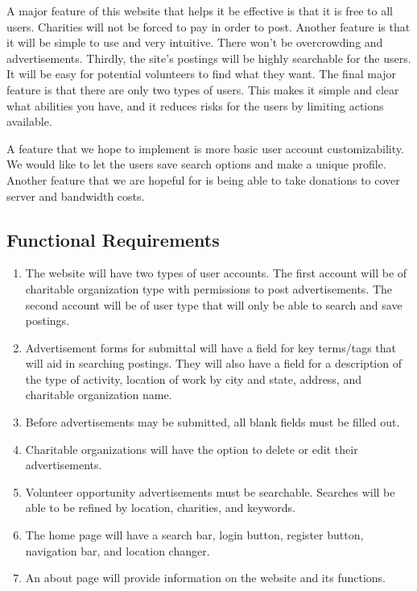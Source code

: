 \documentclass[12pt]{article}
\begin{document}
A major feature of this website that helps it be effective is that it is free to all
users. Charities will not be forced to pay in order to post. Another feature is that it
will be simple to use and very intuitive. There won't be overcrowding and advertisements.
Thirdly, the site's postings will be highly searchable for the users. It will be easy for
potential volunteers to find what they want. The final major feature is that there are
only two types of users. This makes it simple and clear what abilities you have, and it
reduces risks for the users by limiting actions available.

A feature that we hope to implement is more basic user account customizability. We would
like to let the users save search options and make a unique profile. Another feature that
we are hopeful for is being able to take donations to cover server and bandwidth costs.
\subsection{Functional Requirements}
\begin{enumerate}
\item
	The website will have two types of user accounts. The first account will be of
	charitable organization type with permissions to post advertisements. The second
	account will be of user type that will only be able to search and save postings.
\item
	Advertisement forms for submittal will have a field for key terms/tags that will
	aid in searching postings. They will also have a field for a description of the
	type of activity, location of work by city and state, address, and charitable
	organization name.
\item
	Before advertisements may be submitted, all blank fields must be filled out.
\item
	Charitable organizations will have the option to delete or edit their
	advertisements.
\item
	Volunteer opportunity advertisements must be searchable. Searches will be able to
	be refined by location, charities, and keywords.
\item
	The home page will have a search bar, login button, register button, navigation
	bar, and location changer.
\item
	An about page will provide information on the website and its functions.
\end{enumerate}
\end{document}
